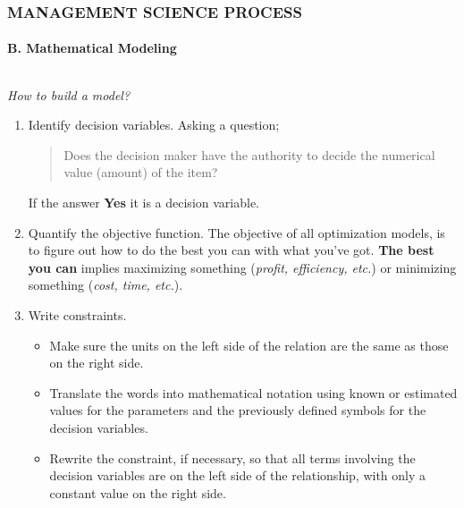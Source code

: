 \documentclass[14 pt]{beamer}
\begin{document}

\begin{frame}[t]
\frametitle{MANAGEMENT SCIENCE PROCESS}
\framesubtitle{B. Mathematical Modeling}

\begin{columns}[t]
\begin{column}{0.45\textwidth}
\emph{How to build a model?}
\vskip0.5cm%
\begin{enumerate}
  \item Identify decision variables.
\vskip0.5cm%
Asking a question;
\begin{quote}
Does the decision maker have the authority to decide the numerical value (amount) of the item?
\end{quote}

If the answer \textbf{Yes} it is a decision variable.
\vskip0.5cm%
  \item Quantify the objective function.
\vskip0.5cm%
The objective of all optimization models, is to figure out how to do the best you can with what you’ve got. \textbf{The best you can} implies maximizing something (\emph{profit, efficiency, etc.}) or minimizing something (\emph{cost, time, etc.}).
\vskip0.5cm%
  \item Write constraints.
\vskip0.5cm%
\begin{itemize}
  \item Make sure the units on the left side of the relation are the same as those on the right side.
  \item Translate the words into mathematical notation using known or estimated values for the parameters and the previously defined symbols for the decision variables.
  \item Rewrite the constraint, if necessary, so that all terms involving the decision variables are on the left side of the relationship, with only a constant value on the right side.
\end{itemize}

\end{enumerate}
\end{column}


\end{columns}
\end{frame}
\end{document}

